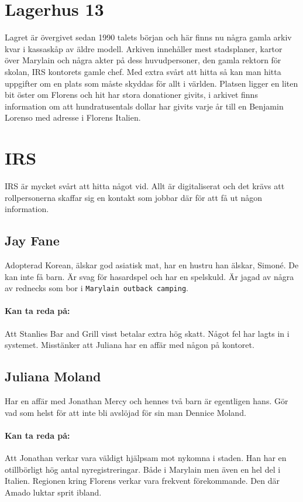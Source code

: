 \documentclass[a5paper,10pt]{report}
\begin{document}
\section{Lagerhus 13}
Lagret är övergivet sedan 1990 talets början och här finns nu några gamla arkiv kvar i kassaskåp av äldre modell. Arkiven innehåller mest stadsplaner, kartor över Marylain och några akter på dess huvudpersoner, den gamla rektorn för skolan, IRS kontorets gamle chef. Med extra svårt att hitta så kan man hitta uppgifter om en plats som måste skyddas för allt i världen. Platsen ligger en liten bit öster om Florens och hit har stora donationer givits, i arkivet finns information om att hundratusentals dollar har givits varje år till en Benjamin Lorenso med adresse i Florens Italien.
\section{IRS}
IRS är mycket svårt att hitta något vid. Allt är digitaliserat och det krävs att rollpersonerna skaffar sig en kontakt som jobbar där för att få ut någon information.
\subsection{Jay Fane}
Adopterad Korean, älskar god asiatisk mat, har en hustru han älskar, Simoné. De kan inte få barn. Är svag för hasardspel och har en spelskuld. Är jagad av några av rednecks som bor i \texttt{Marylain outback camping}.
\paragraph{Kan ta reda på:} Att Stanlies Bar and Grill visst betalar extra hög skatt. Något fel har lagts in i systemet. Misstänker att Juliana har en affär med någon på kontoret.
\subsection{Juliana Moland}
Har en affär med Jonathan Mercy och hennes två barn är egentligen hans. Gör vad som helst för att inte bli avslöjad för sin man Dennice Moland.
\paragraph{Kan ta reda på:} Att Jonathan verkar vara väldigt hjälpsam mot nykomna i staden. Han har en otillbörligt hög antal nyregistreringar. Både i Marylain men även en hel del i Italien. Regionen kring Florens verkar vara frekvent förekommande. Den där Amado luktar sprit ibland.
\end{document}
